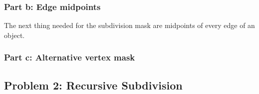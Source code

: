 \documentclass[11.5pt,oneside,a4paper]{scrartcl}
\newcounter{ct}
\begin{document}
\subsubsection{Part b: Edge midpoints}
The next thing needed for the subdivision mask are midpoints of every edge of an object.

\subsubsection{Part c: Alternative vertex mask}

\subsection{Problem 2: Recursive Subdivision}
\end{document}
